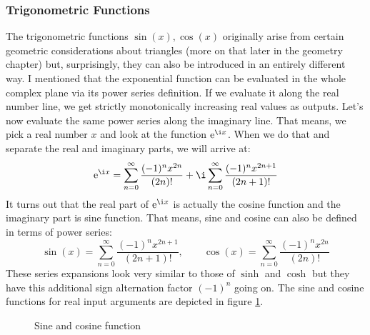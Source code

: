 \subsubsection{Trigonometric Functions}
The trigonometric functions $\sin(x), \cos(x)$ originally arise from certain geometric considerations about triangles (more on that later in the geometry chapter) but, surprisingly, they can also be introduced in an entirely different way. I mentioned that the exponential function can be evaluated in the whole complex plane via its power series definition. If we evaluate it along the real number line, we get strictly monotonically increasing real values as outputs. Let's now evaluate the same power series along the imaginary line. That means, we pick a real number $x$ and look at the function $\e^{\i x}$. When we do that and separate the real and imaginary parts, we will arrive at:
\begin{equation}
\e^{\i x} =      \sum_{n=0}^{\infty} \frac{(-1)^n x^{2n}  }{(2n)!} 
            + \i \sum_{n=0}^{\infty} \frac{(-1)^n x^{2n+1}}{(2n+1)!}
\end{equation}
It turns out that the real part of $\e^{\i x}$ is actually the cosine function and the imaginary part is sine function. That means, sine and cosine can also be defined in terms of power series:
\begin{equation}
\sin(x) = \sum_{n=0}^{\infty} \frac{(-1)^n x^{2n+1}}{(2n+1)!}, \qquad
\cos(x) = \sum_{n=0}^{\infty} \frac{(-1)^n x^{2n}  }{(2n)!}
\end{equation}
These series expansions look very similar to those of $\sinh$ and $\cosh$ but they have this additional sign alternation factor $(-1)^n$ going on. The sine and cosine functions for real input arguments are depicted in figure \ref{Fig:SineAndCosine}.
\begin{figure}[h]
\centering
\caption{Sine and cosine function}
\label{Fig:SineAndCosine}
\end{figure}
